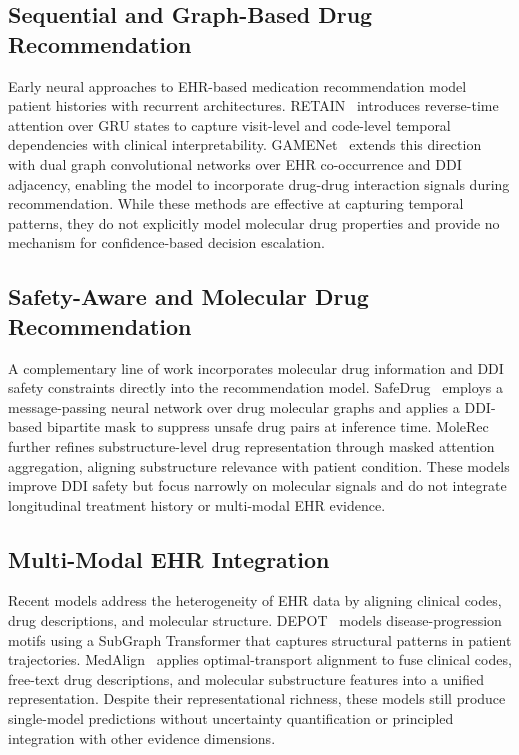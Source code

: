 \documentclass[sigconf,anonymous]{acmart}
\begin{document}
\subsection{Sequential and Graph-Based Drug Recommendation}
Early neural approaches to EHR-based medication recommendation model patient histories with recurrent architectures. RETAIN~\cite{retain} introduces reverse-time attention over GRU states to capture visit-level and code-level temporal dependencies with clinical interpretability. GAMENet~\cite{gamenet} extends this direction with dual graph convolutional networks over EHR co-occurrence and DDI adjacency, enabling the model to incorporate drug-drug interaction signals during recommendation. While these methods are effective at capturing temporal patterns, they do not explicitly model molecular drug properties and provide no mechanism for confidence-based decision escalation.

\subsection{Safety-Aware and Molecular Drug Recommendation}
A complementary line of work incorporates molecular drug information and DDI safety constraints directly into the recommendation model. SafeDrug~\cite{safedrug} employs a message-passing neural network over drug molecular graphs and applies a DDI-based bipartite mask to suppress unsafe drug pairs at inference time. MoleRec~\cite{molerec} further refines substructure-level drug representation through masked attention aggregation, aligning substructure relevance with patient condition. These models improve DDI safety but focus narrowly on molecular signals and do not integrate longitudinal treatment history or multi-modal EHR evidence.

\subsection{Multi-Modal EHR Integration}
Recent models address the heterogeneity of EHR data by aligning clinical codes, drug descriptions, and molecular structure. DEPOT~\cite{depot} models disease-progression motifs using a SubGraph Transformer that captures structural patterns in patient trajectories. MedAlign~\cite{medalign} applies optimal-transport alignment to fuse clinical codes, free-text drug descriptions, and molecular substructure features into a unified representation. Despite their representational richness, these models still produce single-model predictions without uncertainty quantification or principled integration with other evidence dimensions.
\end{document}
